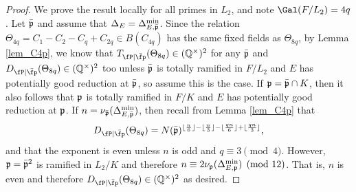\begin{proof}
    We prove the result locally for all primes in $L_2$, and note $\Gal(F/L_2)=4q$. Let $\bar{\mathfrak{p}}$ and assume that $\Delta_E=\Delta_{E,\bar{\mathfrak{p}}}^{\min}$. Since the relation $\Theta_{4q}=C_1-C_2-C_q+C_{2q}\in B(C_{4q})$ has the same fixed fields as $\Theta_{8q}$, by Lemma \ref{lem_C4p}, we know that $\Tpb(\Theta_{8q})\in\QQss$ for any $\bar{\mathfrak{p}}$ and $\Dpb(\Theta_{8q})\in\QQss$ too unless $\bar{\mathfrak{p}}$ is totally ramified in $F/L_2$ and $E$ has potentially good reduction at $\bar{\mathfrak{p}}$, so assume this is the case. If $\mathfrak{p}=\bar{\mathfrak{p}}\cap K$, then it also follows that $\mathfrak{p}$ is totally ramified in $F/K$ and $E$ has potentially good reduction at $\mathfrak{p}$. If $n=\nu_{\bar{\mathfrak{p}}}(\Delta_{E,\bar{\mathfrak{p}}}^{\min})$, then recall from Lemma \ref{lem_C4p} that 
    $$\Dpb(\Theta_{8q})=N(\bar\pp)^{\floor{\frac{n}{6}}-\floor{\frac{n}{3}}-\floor{\frac{qn}{6}}+\floor{\frac{qn}{3}}},$$
    and that the exponent is even unless $n$ is odd and $q\equiv 3\pmod{4}$. However, $\mathfrak{p}=\bar{\mathfrak{p}}^2$ is ramified in $L_2/K$ and therefore $n\equiv 2\nu_{\mathfrak{p}}(\Delta_{E,\mathfrak{p}}^{\min})\pmod{12}$. That is, $n$ is even and therefore $\Dpb(\Theta_{8q})\in\QQss$ as desired.

\end{proof}

